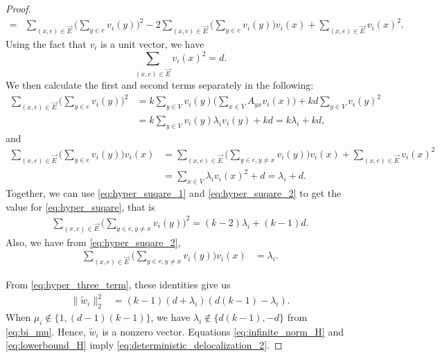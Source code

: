 \documentclass[11pt,reqno]{amsart}
\theoremstyle{definition}
\begin{document}
\begin{proof}
\begin{align}
    =&  \sum_{(x,e)  \in \vec{E}} \bigg(\sum_{y\in e} v_i(y) \bigg)^2 - 2 \sum_{(x,e)  \in \vec{E}} \bigg(\sum_{y\in e} v_i(y) \bigg) v_i(x) + \sum_{(x,e)  \in \vec{E}} v_i(x)^2.
\end{align}
Using the fact that $v_i$ is a unit vector, we have $$\sum_{(x,e)  \in \vec{E}} v_i(x)^2 = d .$$ We then calculate the first and second terms separately in the following: \begin{align}\label{eq:hyper_suqare_1}
     \sum_{(x,e)  \in \vec{E}} \bigg(\sum_{y\in e} v_i(y) \bigg)^2 &= k \sum_{y \in V} v_i(y) \bigg( \sum_{x \in V} A_{yx} v_i(x) \bigg) + kd \sum_{y \in V} v_i(y)^2 \\
     &= k  \sum_{y \in V} v_i(y) \lambda_i v_i(y) + kd = k\lambda_i + kd,
\end{align}
and \begin{align}\label{eq:hyper_suqare_2}
    \sum_{(x,e)  \in \vec{E}} \bigg(\sum_{y\in e} v_i(y) \bigg) v_i(x)
    &= \sum_{(x,e)  \in \vec{E}} \bigg(\sum_{y\in e, y \neq x} v_i(y) \bigg) v_i(x) + \sum_{(x,e)  \in \vec{E}} v_i(x)^2 \\
   &= \sum_{x \in V} \lambda_i v_i(x)^2 + d = \lambda_i+d.
\end{align}
Together, we can use \eqref{eq:hyper_suqare_1} and \eqref{eq:hyper_suqare_2} to get the value for \eqref{eq:hyper_suqare}, that is  \begin{align}
    \sum_{(x,e)  \in \vec{E}} \bigg(\sum_{y\in e, y\not=x} v_i(y) \bigg)^2 = (k-2)\lambda_i+(k-1)d .
\end{align}
Also, we have from \eqref{eq:hyper_suqare_2},
\begin{align}
     \sum_{(x,e)  \in \vec{E}} \bigg(\sum_{y\in e, y\not=x} v_i(y) \bigg) v_i(x) &=\lambda_i.
\end{align}

From \eqref{eq:hyper_three_term}, these identities give us \begin{align}\label{eq:lowerbound_H}
    \| \tilde w_i \|_2^2& =(k-1)(d+\lambda_i)(d(k-1)-\lambda_i).
\end{align}
When $\mu_i\notin\{1,(d-1)(k-1)\}$, we have $\lambda_i\notin \{d(k-1), -d\}$ from \eqref{eq:bi_mu}. Hence, $\tilde w_i$ is a nonzero vector. 
Equations \eqref{eq:infinite_norm_H} and \eqref{eq:lowerbound_H} imply \eqref{eq:deterministic_delocalization_2}.
\end{proof}
\end{document}
